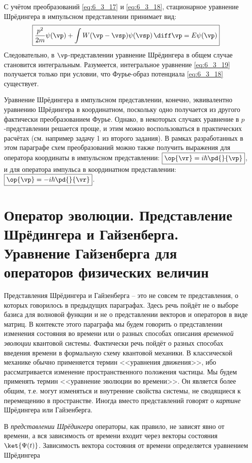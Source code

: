 С учётом преобразований \eqref{eq:6_3_17} и \eqref{eq:6_3_18}, стационарное уравнение Шрёдингера в импульсном представлении принимает вид:
\begin{equation}
\label{eq:6_3_19}
	\boxed{\frac{p^2}{2m} \psi(\vp) + \int W(\vp - \vsp) \psi(\vsp) \, \diff\vp  = E\psi(\vp)}
\end{equation}%
%
Следовательно, в $\vp$-представлении уравнение Шрёдингера в общем случае становится интегральным. Разумеется, интегральное уравнение \eqref{eq:6_3_19} получается только при условии, что Фурье-образ потенциала \eqref{eq:6_3_18} существует.

Уравнение Шрёдингера в импульсном представлении, конечно, эквивалентно уравнению Шрёдингера в координатном, поскольку одно получается из другого фактически преобразованием Фурье. Однако, в некоторых случаях уравнение в $p$-представлении решается проще, и этим можно воспользоваться в практических расчётах (см. например задачу 1 из второго задания). В рамках разработанных в этом параграфе схем преобразований можно также получить выражения для оператора координаты в импульсном представлении: $\boxed{\op{\vr} = i\hbar \pd{}{\vp}}$, и для оператора импульса в координатном представлении: $\boxed{\op{\vp} = -i\hbar \pd{}{\vr}}$.

\section{Оператор эволюции. Представление Шрёдингера и Гайзенберга. Уравнение Гайзенберга для операторов физических величин}

Представления Шрёдингера и Гайзенберга -- это не совсем те представления, о которых говорилось в предыдущих параграфах. Здесь речь пойдёт не о выборе базиса для волновой функции и не о представлении векторов и операторов в виде матриц. В контексте этого параграфа мы будем говорить о представлении изменения состояния во времени или о разных способах описания {\em временной эволюции} квантовой системы. Фактически речь пойдёт о разных способах введения времени в формальную схему квантовой механики. В классической механике обычно применяется термин <<уравнения движения>>, ибо рассматривается изменение пространственного положения частицы. Мы будем применять термин <<уравнение эволюции во времени>>. Он является более общим, т.е. могут изменяться и внутренние свойства системы, не сводящиеся к перемещению в пространстве. Иногда вместо представлений говорят о {\em картине} Шрёдингера или Гайзенберга.

В {\em представлении Шрёдингера} операторы, как правило, не зависят явно от времени, а вся зависимость от времени входит через векторы состояния $\ket{\Psi(t)}$. Зависимость вектора состояния от времени определяется уравнением Шрёдингера

